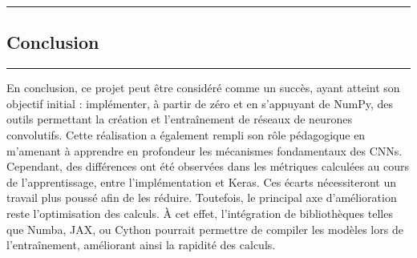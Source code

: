 {\color{gray}\hrule}
\begin{center}
\section{Conclusion}
\bigskip
\end{center}
{\color{gray}\hrule}
\vspace{0.5cm}

En conclusion, ce projet peut être considéré comme un succès, ayant atteint son objectif initial : 
implémenter, à partir de zéro et en s’appuyant de NumPy, des outils permettant la création et 
l’entraînement de réseaux de neurones convolutifs. Cette réalisation a également rempli son rôle 
pédagogique en m’amenant à apprendre en profondeur les mécanismes fondamentaux des CNNs. \\

Cependant, des différences ont été observées dans les métriques calculées au cours de l’apprentissage, 
entre l'implémentation et Keras. Ces écarts nécessiteront un travail plus poussé afin de les réduire. 
Toutefois, le principal axe d’amélioration reste l’optimisation des calculs. À cet effet, l’intégration de 
bibliothèques telles que Numba, JAX, ou Cython pourrait permettre de compiler les modèles lors de l’entraînement, 
améliorant ainsi la rapidité des calculs. 